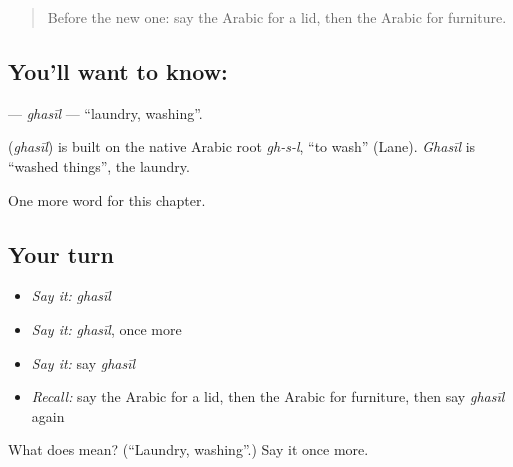 \label{lesson:AR-C213-ghasil}



\begin{quote}
Before the new one: say the Arabic for a lid, then the Arabic for furniture.
\end{quote}

\subsection*{You'll want to know: }
\textbf{} — \emph{ghasīl} — \textquotedblleft{}laundry, washing\textquotedblright{}.

\begin{cousinweb}
\textbf{} (\emph{ghasīl}) is built on the native Arabic root \emph{gh-s-l}, \textquotedblleft{}to wash\textquotedblright{} (Lane). \emph{Ghasīl} is \textquotedblleft{}washed things\textquotedblright{}, the laundry.
\end{cousinweb}

\begin{grammarlens}[title={What you've built}]
One more word for this chapter.
\end{grammarlens}

\subsection*{Your turn}
\begin{itemize}
\raggedright
  \item \emph{Say it:} \emph{ghasīl}
  \item \emph{Say it:} \emph{ghasīl}, once more
  \item \emph{Say it:} say \emph{ghasīl}
  \item \emph{Recall:} say the Arabic for a lid, then the Arabic for furniture, then say \emph{ghasīl} again
\end{itemize}

\begin{tcolorbox}[breakable,colback=teal!4,colframe=teal!35!black,title={Before you move on}]
What does  mean? (\textquotedblleft{}Laundry, washing\textquotedblright{}.) Say it once more.
\end{tcolorbox}
